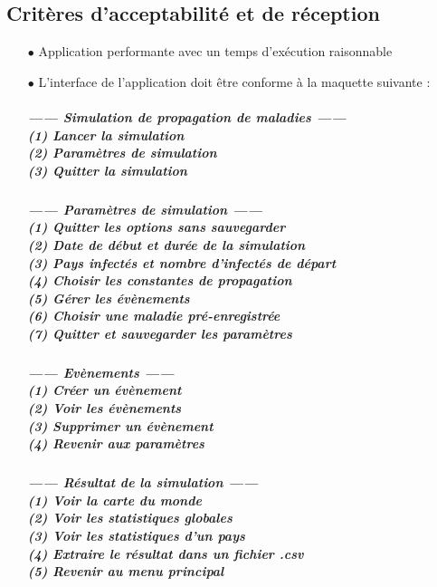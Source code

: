 \documentclass[12pt,a4paper]{report}
\begin{document}
\subsection*{Critères d'acceptabilité et de réception}
\begin{flushleft}
  \begin{itemize}
	\item[$\bullet$] Application performante avec un temps d'exécution raisonnable \\
	\item[$\bullet$] L'interface de l'application doit être conforme à la maquette suivante :\\
\subparagraph*{
------ Simulation de propagation de maladies ------\\
(1) Lancer la simulation\\
(2) Paramètres de simulation\\
(3) Quitter la simulation\\
}
\subparagraph*{  
------ Paramètres de simulation ------\\
(1) Quitter les options sans sauvegarder\\
(2) Date de début et durée de la simulation\\
(3) Pays infectés et nombre d'infectés de départ\\
(4) Choisir les constantes de propagation\\
(5) Gérer les évènements\\
(6) Choisir une maladie pré-enregistrée\\
(7) Quitter et sauvegarder les paramètres\\
}
\subparagraph*{  
------ Evènements ------\\
(1) Créer un évènement\\
(2) Voir les évènements\\
(3) Supprimer un évènement\\
(4) Revenir aux paramètres\\
}
\subparagraph*{  
------ Résultat de la simulation ------\\
(1) Voir la carte du monde\\
(2) Voir les statistiques globales\\
(3) Voir les statistiques d'un pays\\
(4) Extraire le résultat dans un fichier .csv\\
(5) Revenir au menu principal\\
}
  \end{itemize}
\end{flushleft}
\end{document}
